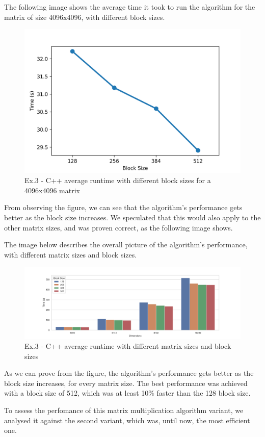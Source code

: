 \documentclass[10pt, titlepage]{extarticle}
\begin{document}
The following image shows the average time it took to run the algorithm for the matrix of size 4096x4096,
with different block sizes.

\begin{figure}[H]
    \centering
    \includegraphics[width=0.5\linewidth]{../plots/ex3/ex3-4096.png}
    \caption{Ex.3 - C++ average runtime with different block sizes for a 4096x4096 matrix}
\end{figure}

From observing the figure, we can see that the algorithm's performance gets better as the block size increases.
We speculated that this would also apply to the other matrix sizes, and was proven correct, as the following image shows.

The image below describes the overall picture of the algorithm's performance, with different matrix sizes and block sizes.

\begin{figure}[H]
    \centering
    \includegraphics[width=\linewidth]{../plots/ex3/ex3-overall.png}
    \caption{Ex.3 - C++ average runtime with different matrix sizes and block sizes}
\end{figure}

As we can prove from the figure, the algorithm's performance gets better as the block size increases, for every matrix size.
The best performance was achieved with a block size of 512, which was at least 10\% faster than the 128 block size.

\vskip 20pt

To assess the perfomance of this matrix multiplication algorithm variant, we analysed it against the second variant,
which was, until now, the most efficient one.
\end{document}
